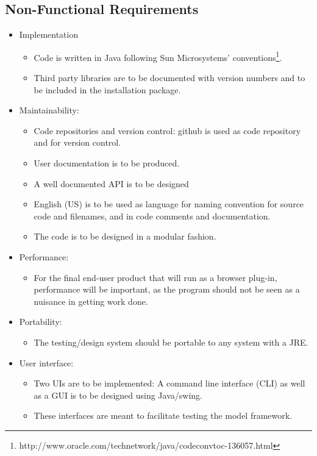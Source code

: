 \subsection{Non-Functional Requirements}
\begin{itemize}
\item Implementation
  \begin{itemize}
  \item Code is written in Java following Sun Microsystems' conventions\footnote{http://www.oracle.com/technetwork/java/codeconvtoc-136057.html}.
  \item Third party libraries are to be documented with version numbers and to be included in the installation package.
\end{itemize}

\item Maintainability:
  \begin{itemize}
  \item Code repositories and version control: github is used as code repository and for version control.
  \item User documentation is to be produced.
  \item A well documented API is to be designed	
  \item English (US) is to be used as language for naming convention for source code and filenames, and in code comments and documentation.
  \item The code is to be designed in a modular fashion.
  \end{itemize}

\item Performance: 
  \begin{itemize}
  \item For the final end-user product that will run as a browser plug-in, performance will be important, as the program should not be seen as a nuisance in getting work done.
  \end{itemize}

\item Portability: 
  \begin{itemize}
  \item The testing/design system should be portable to any system with a JRE.
  \end{itemize}

\item User interface:
  \begin{itemize}
  \item Two UIs are to be implemented: A command line interface (CLI) as well as a GUI is to be designed using Java/swing.
  \item These interfaces are meant to facilitate testing the model framework.
  \end{itemize}


\end{itemize}
